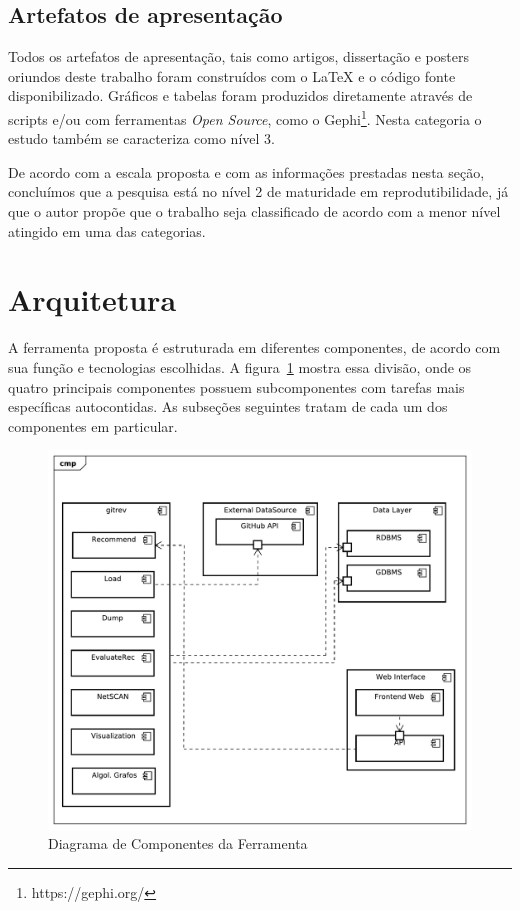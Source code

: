 \documentclass[12pt,openany,oneside,a4paper,english,brazil]{abntbibufjf}
\begin{document}
    \subsection{Artefatos de apresentação}

    Todos os artefatos de apresentação, tais como artigos, dissertação e posters oriundos deste trabalho foram construídos com o \LaTeX \cite{lamport1994} e o código fonte disponibilizado. Gráficos e tabelas foram produzidos diretamente através de scripts e/ou com ferramentas \textit{Open Source}, como o Gephi\footnote{https://gephi.org/}. Nesta categoria o estudo também se caracteriza como nível 3.

    De acordo com a escala proposta \cite{sinha2016} e com as informações prestadas nesta seção, concluímos que a pesquisa está no nível 2 de maturidade em reprodutibilidade, já que o autor propõe que o trabalho seja classificado de acordo com a menor nível atingido em uma das categorias.

    \section{Arquitetura}\label{sec:arquitetura}

		A ferramenta proposta é estruturada em diferentes componentes, de acordo com sua função e tecnologias escolhidas. A figura~\ref{fig:componentes} mostra essa divisão, onde os quatro principais componentes possuem subcomponentes com tarefas mais específicas autocontidas. As subseções seguintes tratam de cada um dos componentes em particular.


    \begin{figure}[!htbp]
        \centering
        \includegraphics[width=.8\textwidth]{componentes}
        \caption{Diagrama de Componentes da Ferramenta}\label{fig:componentes}
    \end{figure}
\end{document}
